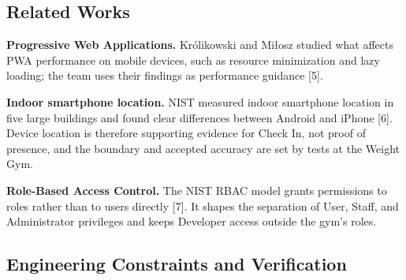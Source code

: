 \subsection{Related Works}

\textbf{Progressive Web Applications.} Królikowski and Mi{\l}osz studied what affects PWA performance on mobile devices, such as resource minimization and lazy loading; the team uses their findings as performance guidance [5].

\textbf{Indoor smartphone location.} NIST measured indoor smartphone location in five large buildings and found clear differences between Android and iPhone [6]. Device location is therefore supporting evidence for Check In, not proof of presence, and the boundary and accepted accuracy are set by tests at the Weight Gym.

\textbf{Role-Based Access Control.} The NIST RBAC model grants permissions to roles rather than to users directly [7]. It shapes the separation of User, Staff, and Administrator privileges and keeps Developer access outside the gym's roles.

\subsection{Engineering Constraints and Verification}

